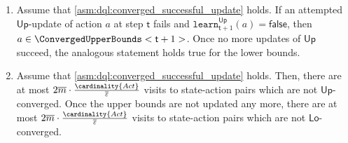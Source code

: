 \documentclass{article}
\newcommand{\lfalse}{\mathsf{false}}
\newcommand{\Actions}{Act}
\newcommand{\upperbound}{\mathsf{Up}}
\newcommand{\lowerbound}{\mathsf{Lo}}
\newcommand{\updatestep}{{\overline{\varepsilon}}}
\newcommand{\delay}{{\overline{m}}}
\newcommand{\learn}{\texttt{learn}}
\newcommand{\algostep}{\mathsf{t}}
\begin{document}
\begin{lemma}
\begin{enumerate}
		\item \label{item:stm:dql:properties:unsuccessful_update_means_converged}
		Assume that \cref{asm:dql:converged_successful_update} holds.
		If an attempted $\upperbound$-update  of action $a$ at step $\algostep$ fails and $\learn^\upperbound_{\algostep+1}(a) = \lfalse$, then $a \in \ConvergedUpperBounds<\algostep+1>$.
		Once no more updates of $\upperbound$ succeed, the analogous statement holds true for the lower bounds.

		\item \label{item:stm:dql:properties:non_converged_visit_count}
		Assume that \cref{asm:dql:converged_successful_update} holds.
		Then, there are at most $2 \delay \cdot \frac{\cardinality{\Actions}}{\updatestep}$ visits to state-action pairs which are not $\upperbound$-converged.
		Once the upper bounds are not updated any more, there are at most $2 \delay \cdot \frac{\cardinality{\Actions}}{\updatestep}$ visits to state-action pairs which are not $\lowerbound$-converged.
	\end{enumerate}
\end{lemma}
\end{document}
